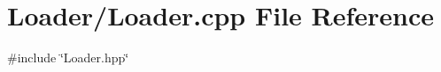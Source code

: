 \section{Loader/\+Loader.cpp File Reference}
\label{_loader_8cpp}
{\ttfamily \#include \char`\"{}Loader.\+hpp\char`\"{}}\newline

